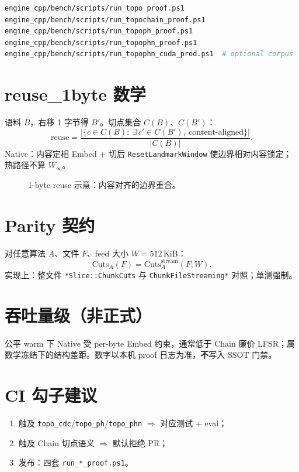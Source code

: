 \begin{lstlisting}[language=bash,caption={PowerShell 一键证明},label={lst:proof-scripts}]
engine_cpp/bench/scripts/run_topo_proof.ps1
engine_cpp/bench/scripts/run_topochain_proof.ps1
engine_cpp/bench/scripts/run_topoph_proof.ps1
engine_cpp/bench/scripts/run_topophn_proof.ps1
engine_cpp/bench/scripts/run_topophn_cuda_prod.ps1  # optional corpus
\end{lstlisting}

\section{reuse\_1byte 数学}

语料 $B$，右移 1 字节得 $B'$。切点集合 $C(B)$、$C(B')$：
\begin{equation}
\mathrm{reuse}
=\frac{\bigl|\{c\in C(B):\ \exists\,c'\in C(B'),\ \text{content-aligned}\}\bigr|}{|C(B)|}.
\end{equation}
Native：内容定相 Embed + 切后 \texttt{ResetLandmarkWindow} 使边界相对内容锁定；热路径不算 $W_\infty$。

\begin{figure}[htbp]
\centering
{}
\caption{1-byte reuse 示意：内容对齐的边界重合。}
\label{fig:reuse}
\end{figure}

\section{Parity 契约}

对任意算法 $A$、文件 $F$、feed 大小 $W=512\,\mathrm{KiB}$：
\begin{equation}
\mathrm{Cuts}_A(F)=\mathrm{Cuts}^{\mathrm{stream}}_A(F;W).
\end{equation}
实现上：整文件 \texttt{*Slice::ChunkCuts} 与 \texttt{ChunkFileStreaming*} 对照；单测强制。

\section{吞吐量级（非正式）}

公平 warm 下 Native 受 per-byte Embed 约束，通常低于 Chain 廉价 LFSR；属数学冻结下的结构差距。数字以本机 proof 日志为准，\textbf{不}写入 SSOT 门禁。

\section{CI 勾子建议}

\begin{enumerate}[nosep]
  \item 触及 \texttt{topo\_cdc}/\texttt{topo\_ph}/\texttt{topo\_phn} $\Rightarrow$ 对应测试 + eval；
  \item 触及 Chain 切点语义 $\Rightarrow$ 默认拒绝 PR；
  \item 发布：四套 \texttt{run\_*\_proof.ps1}。
\end{enumerate}
